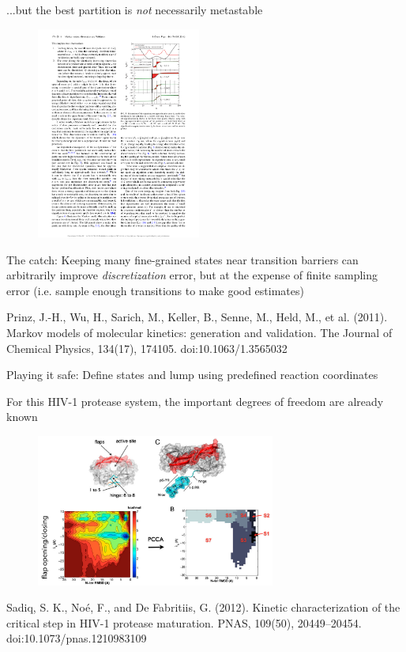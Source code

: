 \documentclass{beamer}
\begin{document}
\begin{frame}{...but the best partition is \textit{not} necessarily metastable}


\begin{figure}
\includegraphics[width=0.48\textwidth]{discretization-error}
\end{figure}

\small
The catch: Keeping many fine-grained states near transition barriers can arbitrarily improve \textit{discretization} error, but at the expense of finite sampling error (i.e. sample enough transitions to make good estimates)   
\normalsize

\tiny
Prinz, J.-H., Wu, H., Sarich, M., Keller, B., Senne, M., Held, M., et al. (2011). Markov models of molecular kinetics: generation and validation. The Journal of Chemical Physics, 134(17), 174105. doi:10.1063/1.3565032
\normalsize

\end{frame}


\begin{frame}{Playing it safe: Define states and lump using predefined reaction coordinates}

For this HIV-1 protease system, the important degrees of freedom are already known
\begin{figure}
\includegraphics[width=0.7\textwidth]{HIV-flap}
\end{figure}


\tiny
Sadiq, S. K., Noé, F., and De Fabritiis, G. (2012). Kinetic characterization of the critical step in HIV-1 protease maturation. PNAS, 109(50), 20449–20454. doi:10.1073/pnas.1210983109
\normalsize

\end{frame}
\end{document}

